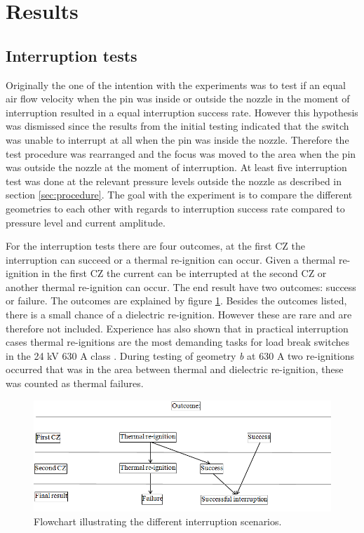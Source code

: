 \documentclass[10pt,a4paper,twoside]{article}
\begin{document}
\cleardoublepage

\section{Results}
\subsection{Interruption tests} \label{sec:interChance}
Originally the one of the intention with the experiments was to test if an equal air flow velocity when the pin was inside or outside the nozzle in the moment of interruption resulted in a equal interruption success rate. However this hypothesis was dismissed since the results from the initial testing indicated that the switch was unable to interrupt at all when the pin was inside the nozzle. Therefore the test procedure was rearranged and the focus was moved to the area when the pin was outside the nozzle at the moment of interruption. At least five interruption test was done at the relevant pressure levels outside the nozzle as described in section \ref{sec:procedure}. The goal with the experiment is to compare the different geometries to each other with regards to interruption success rate compared to pressure level and current amplitude.

For the interruption tests there are four outcomes, at the first CZ the interruption can succeed or a thermal re-ignition can occur. Given a thermal re-ignition in the first CZ the current can be interrupted at the second CZ or another thermal re-ignition can occur. The end result have two outcomes: success or failure. The outcomes are explained by figure \ref{fig:pilSuccessOfFail}. Besides the outcomes listed, there is a small chance of a dielectric re-ignition. However these are rare and are therefore not included. Experience has also shown that in practical interruption cases thermal re-ignitions are the most demanding tasks for load break switches in the 24 kV 630 A class \cite{bib:AFIMVLBA}. During testing of geometry \textit{b} at 630 A two re-ignitions occurred that was in the area between thermal and dielectric re-ignition, these was counted as thermal failures.

\begin{figure}[H]
\centering
\includegraphics[scale=0.7]{Bilder/Results/interruptionFlowChart.png}
\caption{Flowchart illustrating the different interruption scenarios.} \label{fig:pilSuccessOfFail}
\end{figure}
\end{document}
